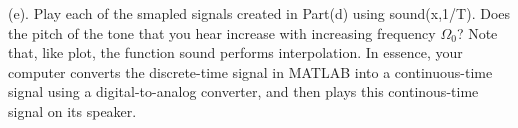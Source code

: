 (e). Play each of the smapled signals created in Part(d) using sound(x,1/T). Does the pitch of the tone that you hear increase with increasing frequency $\Omega_0$? Note that, like plot, the function sound performs interpolation. In essence, your computer converts the discrete-time signal in MATLAB into a continuous-time signal using a digital-to-analog converter, and then plays this continous-time signal on its speaker.
